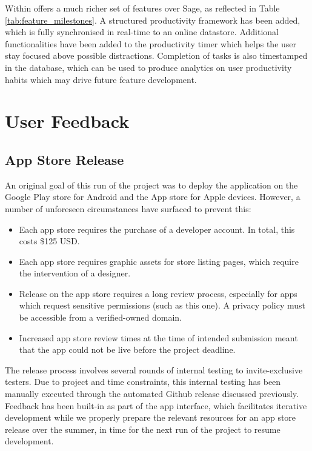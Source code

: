 Within offers a much richer set of features over Sage, as reflected in Table \ref{tab:feature_milestones}. A structured productivity framework has been added, which is fully synchronised in real-time to an online datastore. Additional functionalities have been added to the productivity timer which helps the user stay focused above possible distractions. Completion of tasks is also timestamped in the database, which can be used to produce analytics on user productivity habits which may drive future feature development.

\section{User Feedback}
\subsection{App Store Release}
An original goal of this run of the project was to deploy the application on the Google Play store for Android and the App store for Apple devices. However, a number of unforeseen circumstances have surfaced to prevent this:

\begin{itemize}
	\item Each app store requires the purchase of a developer account. In total, this costs \$125 USD.
	\item Each app store requires graphic assets for store listing pages, which require the intervention of a designer.
	\item Release on the app store requires a long review process, especially for apps which request sensitive permissions (such as this one). A privacy policy must be accessible from a verified-owned domain.
	\item Increased app store review times at the time of intended submission meant that the app could not be live before the project deadline.
\end{itemize}

The release process involves several rounds of internal testing to invite-exclusive testers. Due to project and time constraints, this internal testing has been manually executed through the automated Github release discussed previously. Feedback has been built-in as part of the app interface, which facilitates iterative development while we properly prepare the relevant resources for an app store release over the summer, in time for the next run of the project to resume development.

